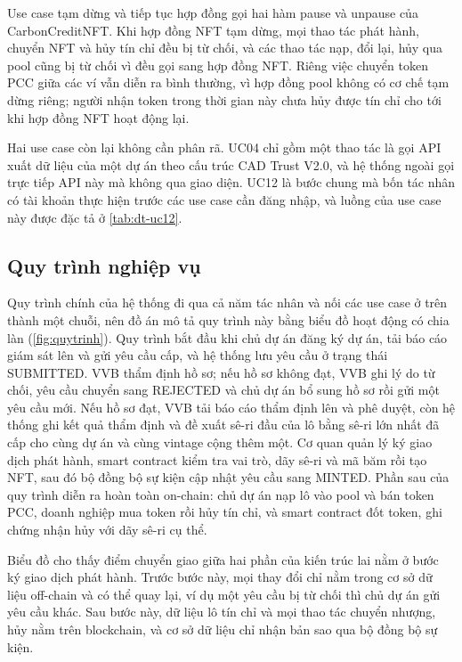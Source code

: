 \HinhUCQuanTri

Use case tạm dừng và tiếp tục hợp đồng gọi hai hàm pause và unpause của CarbonCreditNFT. Khi hợp đồng NFT tạm dừng, mọi thao tác phát hành, chuyển NFT và hủy tín chỉ đều bị từ chối, và các thao tác nạp, đổi lại, hủy qua pool cũng bị từ chối vì đều gọi sang hợp đồng NFT. Riêng việc chuyển token PCC giữa các ví vẫn diễn ra bình thường, vì hợp đồng pool không có cơ chế tạm dừng riêng; người nhận token trong thời gian này chưa hủy được tín chỉ cho tới khi hợp đồng NFT hoạt động lại.

Hai use case còn lại không cần phân rã. UC04 chỉ gồm một thao tác là gọi API xuất dữ liệu của một dự án theo cấu trúc CAD Trust V2.0, và hệ thống ngoài gọi trực tiếp API này mà không qua giao diện. UC12 là bước chung mà bốn tác nhân có tài khoản thực hiện trước các use case cần đăng nhập, và luồng của use case này được đặc tả ở \autoref{tab:dt-uc12}.

\FloatBarrier
\subsection*{Quy trình nghiệp vụ}
\label{subsec:quytrinh}

Quy trình chính của hệ thống đi qua cả năm tác nhân và nối các use case ở trên thành một chuỗi, nên đồ án mô tả quy trình này bằng biểu đồ hoạt động có chia làn (\autoref{fig:quytrinh}). Quy trình bắt đầu khi chủ dự án đăng ký dự án, tải báo cáo giám sát lên và gửi yêu cầu cấp, và hệ thống lưu yêu cầu ở trạng thái SUBMITTED. VVB thẩm định hồ sơ; nếu hồ sơ không đạt, VVB ghi lý do từ chối, yêu cầu chuyển sang REJECTED và chủ dự án bổ sung hồ sơ rồi gửi một yêu cầu mới. Nếu hồ sơ đạt, VVB tải báo cáo thẩm định lên và phê duyệt, còn hệ thống ghi kết quả thẩm định và đề xuất sê-ri đầu của lô bằng sê-ri lớn nhất đã cấp cho cùng dự án và cùng vintage cộng thêm một. Cơ quan quản lý ký giao dịch phát hành, smart contract kiểm tra vai trò, dãy sê-ri và mã băm rồi tạo NFT, sau đó bộ đồng bộ sự kiện cập nhật yêu cầu sang MINTED. Phần sau của quy trình diễn ra hoàn toàn on-chain: chủ dự án nạp lô vào pool và bán token PCC, doanh nghiệp mua token rồi hủy tín chỉ, và smart contract đốt token, ghi chứng nhận hủy với dãy sê-ri cụ thể.

\HinhQuyTrinh

Biểu đồ cho thấy điểm chuyển giao giữa hai phần của kiến trúc lai nằm ở bước ký giao dịch phát hành. Trước bước này, mọi thay đổi chỉ nằm trong cơ sở dữ liệu off-chain và có thể quay lại, ví dụ một yêu cầu bị từ chối thì chủ dự án gửi yêu cầu khác. Sau bước này, dữ liệu lô tín chỉ và mọi thao tác chuyển nhượng, hủy nằm trên blockchain, và cơ sở dữ liệu chỉ nhận bản sao qua bộ đồng bộ sự kiện.

